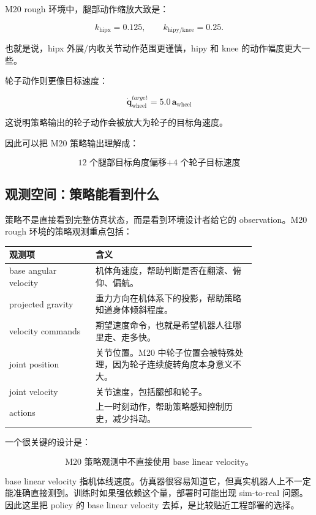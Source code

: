 \documentclass[UTF8,11pt,a4paper]{ctexart}
\newcommand{\bs}[1]{\bm{#1}}
\begin{document}
M20 rough 环境中，腿部动作缩放大致是：

\[
k_{\mathrm{hipx}}=0.125,\qquad
k_{\mathrm{hipy/knee}}=0.25.
\]

也就是说，hipx 外展/内收关节动作范围更谨慎，hipy 和 knee 的动作幅度更大一些。

轮子动作则更像目标速度：

\[
\boxed{
\dot{\bs q}_{\mathrm{wheel}}^{target}
=
5.0\,\bs a_{\mathrm{wheel}}
}
\]

这说明策略输出的轮子动作会被放大为轮子的目标角速度。

因此可以把 M20 策略输出理解成：

\[
\boxed{
\text{12 个腿部目标角度偏移}
+
\text{4 个轮子目标速度}
}
\]

\subsection{观测空间：策略能看到什么}

策略不是直接看到完整仿真状态，而是看到环境设计者给它的 observation。M20 rough 环境的策略观测重点包括：

\begin{center}
\begin{tabular}{p{0.28\linewidth}p{0.52\linewidth}}
\toprule
观测项 & 含义 \\
\midrule
base angular velocity & 机体角速度，帮助判断是否在翻滚、俯仰、偏航。\\
projected gravity & 重力方向在机体系下的投影，帮助策略知道身体倾斜程度。\\
velocity commands & 期望速度命令，也就是希望机器人往哪里走、走多快。\\
joint position & 关节位置。M20 中轮子位置会被特殊处理，因为轮子连续旋转角度本身意义不大。\\
joint velocity & 关节速度，包括腿部和轮子。\\
actions & 上一时刻动作，帮助策略感知控制历史，减少抖动。\\
\bottomrule
\end{tabular}
\end{center}

一个很关键的设计是：

\[
\boxed{
\text{M20 策略观测中不直接使用 base linear velocity。}
}
\]

base linear velocity 指机体线速度。仿真器很容易知道它，但真实机器人上不一定能准确直接测到。训练时如果强依赖这个量，部署时可能出现 sim-to-real 问题。因此这里把 policy 的 base linear velocity 去掉，是比较贴近工程部署的选择。
\end{document}
